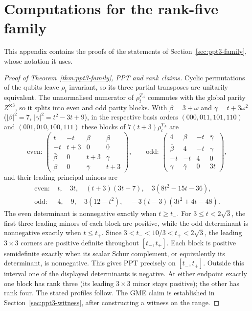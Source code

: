 \section{Computations for the rank-five family}\label{sec:ppt3-app-family}

This appendix contains the proofs of the statements of Section~\ref{sec:ppt3-family}, whose notation it uses.

\begin{proof}[Proof of Theorem~\ref{thm:ppt3-family}, PPT and rank claims]
Cyclic permutations of the qubits leave $\rho_t$ invariant, so
its three partial transposes are unitarily equivalent. The
unnormalised numerator of $\rho_t^{T_A}$ commutes with the global parity $Z^{\otimes3}$, so it splits into even and
odd parity blocks. With $\beta=3+\omega$ and $\gamma=t+3\omega^2$ ($|\beta|^2=7$, $|\gamma|^2=t^2-3t+9$), in the respective basis orders
$(000,011,101,110)$ and $(001,010,100,111)$ these blocks of $7(t+3)\rho_t^{T_A}$ are
\[
\text{even: }\begin{pmatrix}
t & -t & \beta & \bar\beta\\
-t & t+3 & 0 & 0\\
\bar\beta & 0 & t+3 & \gamma\\
\beta & 0 & \bar\gamma & t+3
\end{pmatrix},\qquad
\text{odd: }\begin{pmatrix}
4 & \beta & -t & \bar\gamma\\
\bar\beta & 4 & -t & \gamma\\
-t & -t & 4 & 0\\
\gamma & \bar\gamma & 0 & 3t
\end{pmatrix},
\]
and their leading principal minors are
\begin{equation}\label{eq:ppt3-minors}
\begin{aligned}
\text{even: }&
t,\quad 3t,\quad (t+3)(3t-7),\quad
3(8t^2-15t-36),\\
\text{odd: }&
4,\quad 9,\quad 3(12-t^2),\quad
-3(t-3)(3t^2+4t-48).
\end{aligned}
\end{equation}
The even determinant is nonnegative exactly when $t\ge t_-$.
For $3\le t<2\sqrt3$, the first three leading minors
of each block are positive, while the odd determinant is
nonnegative exactly when $t\le t_+$. Since
$3<t_-<10/3<t_+<2\sqrt3$, the leading $3\times3$ corners are positive definite throughout $[t_-,t_+]$.
Each block is positive semidefinite exactly when its scalar Schur complement, or equivalently its determinant, is
nonnegative. This gives PPT precisely on $[t_-,t_+]$.
Outside this interval one of the displayed determinants
is negative. At either endpoint exactly one block has
rank three (its leading $3\times3$ minor stays positive);
the other has rank four. The stated profiles follow.
The GME claim is established in Section~\ref{sec:ppt3-witness}, after constructing
a witness on the range.
\end{proof}

